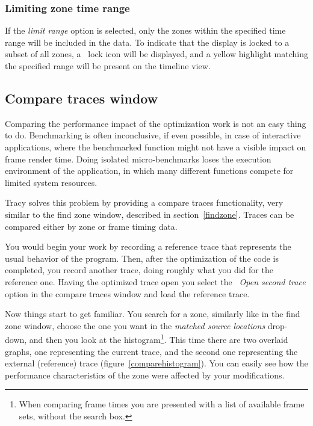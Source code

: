 \documentclass[hidelinks,titlepage,a4paper]{article}
\begin{document}
\subsubsection{Limiting zone time range}

If the \emph{limit range} option is selected, only the zones within the specified time range will be included in the data. To indicate that the display is locked to a subset of all zones, a \faLock{}~lock icon will be displayed, and a yellow highlight matching the specified range will be present on the timeline view.

\subsection{Compare traces window}
\label{compare}

Comparing the performance impact of the optimization work is not an easy thing to do. Benchmarking is often inconclusive, if even possible, in case of interactive applications, where the benchmarked function might not have a visible impact on frame render time. Doing isolated micro-benchmarks loses the execution environment of the application, in which many different functions compete for limited system resources.

Tracy solves this problem by providing a compare traces functionality, very similar to the find zone window, described in section~\ref{findzone}. Traces can be compared either by zone or frame timing data.

You would begin your work by recording a reference trace that represents the usual behavior of the program. Then, after the optimization of the code is completed, you record another trace, doing roughly what you did for the reference one. Having the optimized trace open you select the \emph{\faFolderOpen{}~Open second trace} option in the compare traces window and load the reference trace.

Now things start to get familiar. You search for a zone, similarly like in the find zone window, choose the one you want in the \emph{matched source locations} drop-down, and then you look at the histogram\footnote{When comparing frame times you are presented with a list of available frame sets, without the search box.}. This time there are two overlaid graphs, one representing the current trace, and the second one representing the external (reference) trace (figure~\ref{comparehistogram}). You can easily see how the performance characteristics of the zone were affected by your modifications.
\end{document}
